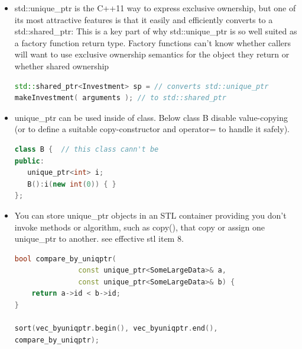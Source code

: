 \documentclass[a4paper,12pt,twoside]{book}
\newcommand{\Hilight}[1]{\makebox[0pt][l]{\color{yellow}\rule[-3pt]{#1em}{11pt}}}
\begin{document}
\begin{itemize}
\begin{lstlisting}[frame=single, language=c++, mathescape=true]
//only c++ 14 support return type deduction
template<typename... Ts>
$\Hilight{4}$auto makeInvestment(Ts&&... params) {
auto delInvmt = [](Investment* pInvestment) {
makeLogEntry(pInvestment); // makedelete
pInvestment; // Investment
};

std::unique_ptr<Investment, decltype(delInvmt)>
pInv(nullptr, delInvmt);

if (...){
pInv.reset(new Stock($\Hilight{16}$std::forward<Ts>(params)...));
}
else if (... ) {
pInv.reset(new Bond(std::forward<Ts>(params)...));
}
return pInv; // as before
}
\end{lstlisting}

\item std::unique\_ptr is the C++11 way to express exclusive ownership, but one of its
most attractive features is that it easily and efficiently converts to a std::shared\_ptr: This is a key part of why std::unique\_ptr is so well suited as a factory function return type. Factory functions can't know whether callers will want to use exclusive ownership semantics for the object they return or whether shared ownership
\begin{lstlisting}[frame=single, language=c++, mathescape=true]
std::shared_ptr<Investment> sp = // converts std::unique_ptr
makeInvestment( arguments ); // to std::shared_ptr
\end{lstlisting}


\item unique\_ptr can be used inside of class. Below class B disable value-copying (or to define a suitable copy-constructor  and operator= to handle it safely).
\begin{lstlisting}[frame=single, language=c++]
class B {  // this class cann't be
public:
   unique_ptr<int> i;
   B():i(new int(0)) { }
};
\end{lstlisting}

\item You can store unique\_ptr objects in an STL container providing you don't invoke methods or algorithm, such as copy(), that copy or assign one unique\_ptr to another.  see effective stl item 8.

\begin{lstlisting}[frame=single, language=c++]
bool compare_by_uniqptr(
               const unique_ptr<SomeLargeData>& a,
               const unique_ptr<SomeLargeData>& b) {
    return a->id < b->id;
}

sort(vec_byuniqptr.begin(), vec_byuniqptr.end(),
compare_by_uniqptr);
\end{lstlisting}


\end{itemize}
\end{document}
